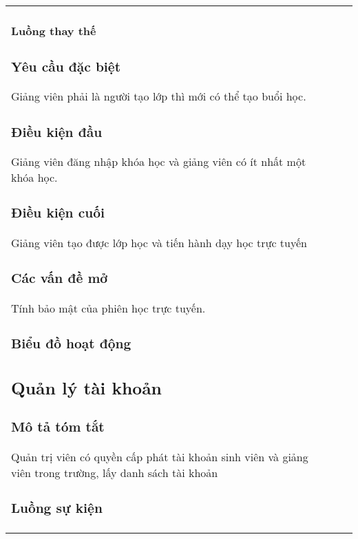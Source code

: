 \documentclass[./../main_file.tex]{subfiles}
\begin{document}
\begin{longtable}{|p{}|p{}|p{}|}
\paragraph{Luồng thay thế}
\subsubsection{Yêu cầu đặc biệt}
Giảng viên phải là người tạo lớp thì mới có thể tạo buổi học.

\subsubsection{Điều kiện đầu}
Giảng viên đăng nhập khóa học và giảng viên có ít nhất một khóa học.

\subsubsection{Điều kiện cuối}
Giảng viên tạo được lớp học và tiến hành dạy học trực tuyến


\subsubsection{Các vấn đề mở}
Tính bảo mật của phiên học trực tuyến.

\subsubsection{Biểu đồ hoạt động}

\subsection{Quản lý tài khoản}
\subsubsection{Mô tả tóm tắt}
Quản trị viên có quyền cấp phát tài khoản sinh viên và giảng viên trong trường, lấy danh sách tài khoản

\subsubsection{Luồng sự kiện}

\end{longtable}
\end{document}
